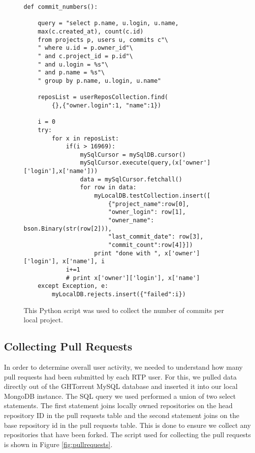 \begin{figure}
\footnotesize
\begin{lstlisting}
def commit_numbers():

    query = "select p.name, u.login, u.name,
    max(c.created_at), count(c.id) 
    from projects p, users u, commits c"\
    " where u.id = p.owner_id"\
    " and c.project_id = p.id"\
    " and u.login = %s"\
    " and p.name = %s"\
    " group by p.name, u.login, u.name"

    reposList = userReposCollection.find(
    	{},{"owner.login":1, "name":1}) 
        
    i = 0
    try:
        for x in reposList:
            if(i > 16969):
                mySqlCursor = mySqlDB.cursor()
                mySqlCursor.execute(query,(x['owner']['login'],x['name']))
                data = mySqlCursor.fetchall()
                for row in data:
                    myLocalDB.testCollection.insert([
                        {"project_name":row[0],
                        "owner_login": row[1],
                        "owner_name": bson.Binary(str(row[2])),
                        "last_commit_date": row[3],
                        "commit_count":row[4]}])
                    print "done with ", x['owner']['login'], x['name'], i
            i+=1
            # print x['owner']['login'], x['name']
    except Exception, e:
        myLocalDB.rejects.insert({"failed":i})
\end{lstlisting}
\caption{This Python script was used to collect the number of commits per local project.}
\label{fig:commits-per-project}
\end{figure}


\subsection{Collecting Pull Requests}
\label{sec-pullreqs}
In order to determine overall user activity, we needed to understand how many pull requests had been submitted by each RTP user. For this, we pulled data directly out of the GHTorrent MySQL database and inserted it into our local MongoDB instance. The SQL query we used performed a union of two select statements. The first statement joins locally owned repositories on the head repository ID in the pull requests table and the second statement joins on the base repository id in the pull requests table. This is done to ensure we collect any repositories that have been forked. The script used for collecting the pull requests is shown in Figure \ref{fig:pullrequests}. 

